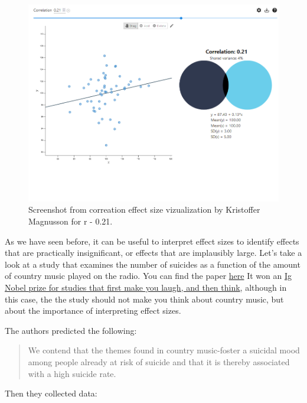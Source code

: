 \documentclass[
  oneside]{book}
\begin{document}
\begin{figure}

{\centering \includegraphics[width=1\linewidth]{images/sharedvariance} 

}

\caption{Screenshot from correation effect size vizualization by Kristoffer Magnusson for r - 0.21.}\label{fig:sharedvariance}
\end{figure}

As we have seen before, it can be useful to interpret effect sizes to identify effects that are practically insignificant, or effects that are implausibly large. Let's take a look at a study that examines the number of suicides as a function of the amount of country music played on the radio. You can find the paper \href{https://heinonline.org/HOL/P?h=hein.journals/josf71\&i=227}{here} It won an \href{http://www.abc.net.au/science/articles/2004/10/01/1211441.htm}{Ig Nobel prize for studies that first make you laugh, and then think}, although in this case, the the study should not make you think about country music, but about the importance of interpreting effect sizes.

The authors predicted the following:

\begin{quote}
We contend that the themes found in country music-foster a suicidal mood among people already at risk of suicide and that it is thereby associated with a high suicide rate.
\end{quote}

Then they collected data:
\end{document}
